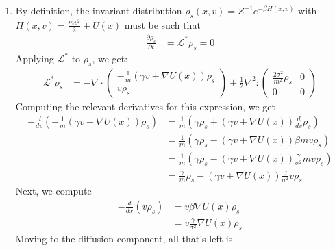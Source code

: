 \documentclass[12pt]{article}
\theoremstyle{plain}
\theoremstyle{definition}
\theoremstyle{remark}
\begin{document}
\begin{enumerate}
\begin{enumerate}
      \item %
        By definition, the invariant distribution $\rho_s(x,v) =
        Z^{-1} e^{-\beta H(x,v)}$ with $H(x,v)=\frac{mv^2}{2} + U(x)$
        must be such that
        \begin{align*}
          \frac{\partial \rho_s}{\partial t}
          &=
          \mathscr{L}^* \rho_s = 0
        \end{align*}
        Applying $\mathscr{L}^*$ to $\rho_s$, we get:
        \begin{align*}
          \mathscr{L}^*\rho_s
          &=
          -\nabla \cdot
          \begin{pmatrix}
            -\frac{1}{m} (\gamma v + \nabla U(x)) \rho_s\\
            v\rho_s
          \end{pmatrix}
          + \frac{1}{2}
          \nabla^2 :
          \begin{pmatrix}
            \frac{2\sigma^2}{m^2}\rho_s & 0 \\
            0 & 0
          \end{pmatrix}
        \end{align*}
        Computing the relevant derivatives for this expression, we get
        \begin{align*}
          -\frac{d}{dv}
          \left( -\frac{1}{m} (\gamma v + \nabla U(x)) \rho_s \right)
          &=
          \frac{1}{m}
          \left(
          \gamma \rho_s
          +(\gamma v + \nabla U(x))
          \frac{d}{dv} \rho_s
          \right)\\
          &=
          \frac{1}{m}
          \left( \gamma \rho_s
          - (\gamma v + \nabla U(x))\beta mv\rho_s \right)\\
          &=
          \frac{1}{m}
          \left(
          \gamma \rho_s
          -
          (\gamma v + \nabla U(x))\frac{\gamma}{\sigma^2} mv\rho_s
          \right)\\
          &=
          \frac{\gamma}{m}
          \rho_s
          -(\gamma v + \nabla U(x))
          \frac{\gamma}{\sigma^2} v\rho_s
        \end{align*}
        Next, we compute
        \begin{align*}
          -\frac{d}{dx} (v\rho_s)
          &= v\beta \nabla U(x)\rho_s\\
          &= v\frac{\gamma}{\sigma^2} \nabla U(x)\rho_s
        \end{align*}
        Moving to the diffusion component, all that's left is

\end{enumerate}
\end{enumerate}
\end{document}

